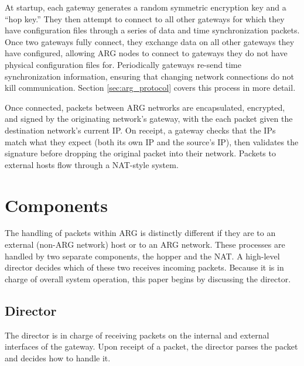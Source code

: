 \par At startup, each gateway generates a random symmetric encryption key and a ``hop key.'' They then attempt to connect to all other gateways for which they have configuration files through a series of data and time synchronization packets. Once two gateways fully connect, they exchange data on all other gateways they have configured, allowing ARG nodes to connect to gateways they do not have physical configuration files for. Periodically gateways re-send time synchronization information, ensuring that changing network connections do not kill communication. Section \ref{sec:arg_protocol} covers this process in more detail.

\par Once connected, packets between ARG networks are encapsulated, encrypted, and signed by the originating network's gateway, with the each packet given the destination network's current IP. On receipt, a gateway checks that the IPs match what they expect (both its own IP and the source's IP), then validates the signature before dropping the original packet into their network. Packets to external hosts flow through a \ac{NAT}-style system. %


\section{Components}
\label{sec:arg_components}
The handling of packets within ARG is distinctly different if they are to an external (non-ARG network) host or to an ARG network. These processes are handled by two separate components, the hopper and the NAT. A high-level director decides which of these two receives incoming packets. Because it is in charge of overall system operation, this paper begins by discussing the director.

\subsection{Director}
\label{sec:arg_director}
\par The director is in charge of receiving packets on the internal and external interfaces of the gateway. Upon receipt of a packet, the director parses the packet and decides how to handle it. 

